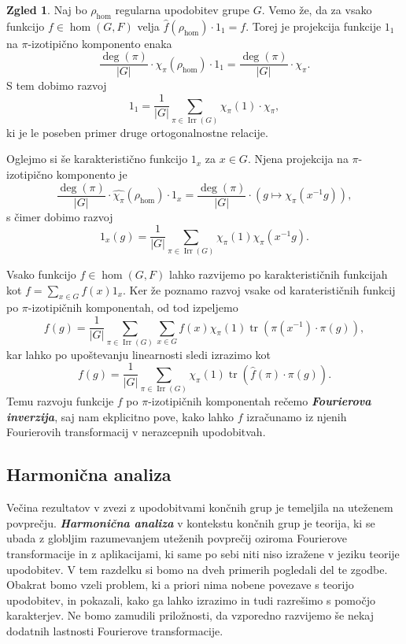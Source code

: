 \documentclass[11pt]{book}
\DeclareMathOperator\tr{tr}
\DeclareMathOperator\Irr{Irr}
\def\definicija{\color{rdeca}\bf\em}
\theoremstyle{definition}
\theoremstyle{zgled}
\newtheorem*{zgled}{Zgled}
\theoremstyle{odprtproblem}
\theoremstyle{domacanaloga}
\theoremstyle{izrek}
\begin{document}
\begin{zgled}
Naj bo $\rho_{\hom}$ regularna upodobitev grupe $G$. Vemo že, da za vsako funkcijo $f \in \hom(G,F)$ velja $\hat{f}(\rho_{\hom}) \cdot 1_1 = f$. Torej je projekcija funkcije $1_1$ na $\pi$-izotipično komponento enaka
\[
    \frac{\deg(\pi)}{|G|} \cdot \widehat{\chi_{\pi}}(\rho_{\hom}) \cdot 1_1 = 
    \frac{\deg(\pi)}{|G|} \cdot \chi_{\pi}.
\]
S tem dobimo razvoj
\[
    1_1 = \frac{1}{|G|} \sum_{\pi \in \Irr(G)} \chi_{\pi}(1) \cdot \chi_{\pi},
\]
ki je le poseben primer druge ortogonalnostne relacije.

Oglejmo si še karakteristično funkcijo $1_x$ za $x \in G$. Njena projekcija na $\pi$-izotipično komponento je
\[
    \frac{\deg(\pi)}{|G|} \cdot \widehat{\chi_{\pi}}(\rho_{\hom}) \cdot 1_x = 
    \frac{\deg(\pi)}{|G|} \cdot \left( g \mapsto \chi_{\pi}(x^{-1}g) \right),
\]
s čimer dobimo razvoj
\[
    1_x(g) = \frac{1}{|G|} \sum_{\pi \in \Irr(G)} \chi_{\pi}(1) \chi_{\pi}(x^{-1} g).
\]

Vsako funkcijo $f \in \hom(G,F)$ lahko razvijemo po karakterističnih funkcijah kot $f = \sum_{x \in G} f(x) 1_x$. Ker že poznamo razvoj vsake od karaterističnih funkcij po $\pi$-izotipičnih komponentah, od tod izpeljemo
\[
    f(g) = \frac{1}{|G|} \sum_{\pi \in \Irr(G)} \sum_{x \in G} f(x) \chi_{\pi}(1) \tr \left( \pi(x^{-1}) \cdot \pi(g) \right),
\]
kar lahko po upoštevanju linearnosti sledi izrazimo kot 
\[
    f(g) = \frac{1}{|G|} \sum_{\pi \in \Irr(G)} \chi_{\pi}(1) \tr \left( \hat{f}(\pi) \cdot \pi(g) \right).
\]
Temu razvoju funkcije $f$ po $\pi$-izotipičnih komponentah rečemo {\definicija Fourierova inverzija}, saj nam ekplicitno pove, kako lahko $f$ izračunamo iz njenih Fourierovih transformacij v nerazcepnih upodobitvah.
\end{zgled}

\subsection{Harmonična analiza}

Večina rezultatov v zvezi z upodobitvami končnih grup je temeljila na uteženem povprečju. {\definicija Harmonična analiza} v kontekstu končnih grup je teorija, ki se ubada z globljim razumevanjem uteženih povprečij oziroma Fourierove transformacije in z aplikacijami, ki same po sebi niti niso izražene v jeziku teorije upodobitev. V tem razdelku si bomo na dveh primerih pogledali del te zgodbe. Obakrat bomo vzeli problem, ki a priori nima nobene povezave s teorijo upodobitev, in pokazali, kako ga lahko izrazimo in tudi razrešimo s pomočjo karakterjev. Ne bomo zamudili priložnosti, da vzporedno razvijemo še nekaj dodatnih lastnosti Fourierove transformacije.
\end{document}
